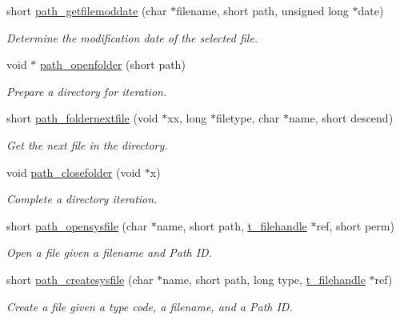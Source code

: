 \begin{DoxyCompactItemize}
short \hyperlink{group__files_ga834e354ef2df52e88d0643e503c4bf6c}{path\_\-getfilemoddate} (char $\ast$filename, short path, unsigned long $\ast$date)
\begin{DoxyCompactList}\small\item\em Determine the modification date of the selected file. \item\end{DoxyCompactList}\item 
void $\ast$ \hyperlink{group__files_ga80aa97732be321d9f2e2212485e0367a}{path\_\-openfolder} (short path)
\begin{DoxyCompactList}\small\item\em Prepare a directory for iteration. \item\end{DoxyCompactList}\item 
short \hyperlink{group__files_ga50f5d1b1d008024bffd65155be7e2721}{path\_\-foldernextfile} (void $\ast$xx, long $\ast$filetype, char $\ast$name, short descend)
\begin{DoxyCompactList}\small\item\em Get the next file in the directory. \item\end{DoxyCompactList}\item 
void \hyperlink{group__files_ga63ca3fd6e4acb9f1b1e56b2d609bf4af}{path\_\-closefolder} (void $\ast$x)
\begin{DoxyCompactList}\small\item\em Complete a directory iteration. \item\end{DoxyCompactList}\item 
short \hyperlink{group__files_gaf244aeb070e1903461070cd7dbe04bf4}{path\_\-opensysfile} (char $\ast$name, short path, \hyperlink{group__files_gafcb776aa74d514754e83b30995b5a5d1}{t\_\-filehandle} $\ast$ref, short perm)
\begin{DoxyCompactList}\small\item\em Open a file given a filename and Path ID. \item\end{DoxyCompactList}\item 
short \hyperlink{group__files_ga044310e9440119f12c57e9b985a9e1a3}{path\_\-createsysfile} (char $\ast$name, short path, long type, \hyperlink{group__files_gafcb776aa74d514754e83b30995b5a5d1}{t\_\-filehandle} $\ast$ref)
\begin{DoxyCompactList}\small\item\em Create a file given a type code, a filename, and a Path ID. \item\end{DoxyCompactList}\item 

\end{DoxyCompactItemize}
